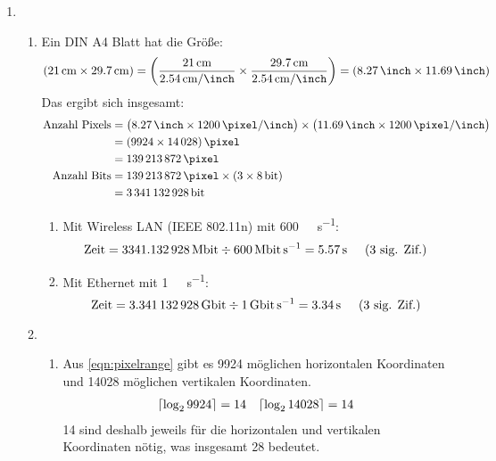 \begin{enumerate}[label={Aufgabe Ü\arabic*},start=1]
    \item 
    	\begin{enumerate}[label={\alph*.}]
    		\item Ein DIN A4 Blatt hat die Größe:
	    		\begin{equation}
	    			\left(\SI{21}{\centi\meter} \times \SI{29.7}{\centi\meter}\right) = 
	    			\left(\frac{\SI{21}{\centi\meter}}{\SI{2.54}{\centi\meter\per\inch}} \times \frac{\SI{29.7}{\centi\meter}}{\SI{2.54}{\centi\meter\per\inch}}\right) = \left(\SI{8,27}{\inch} \times \SI{11,69}{\inch}\right)
	    		\end{equation}
	    		Das ergibt sich insgesamt:
	    		\begin{align}
	    			\text{Anzahl Pixels} &= \left(\SI{8,27}{\inch} \times \SI{1200}{\pixel\per\inch}\right) \times \left(\SI{11,69}{\inch} \times \SI{1200}{\pixel\per\inch}\right) \notag \\
	    			&= \left(\num{9924} \times \num{14028}\right)\si{\pixel} \label{eqn:pixelrange} \\
	    			&= \SI{139213872}{\pixel} \\
	    			\text{Anzahl Bits} &= \SI{139213872}{\pixel} \times \left(3 \times \SI{8}{\bit}\right) \notag \\
	    			&= \SI{3341132928}{\bit}
	    		\end{align}

	    		\begin{enumerate}[label={(\roman*)}]
	    			\item Mit Wireless LAN (IEEE 802.11n) mit \SI[per-mode=symbol]{600}{\mega\bit\per\second}:
		    			\begin{equation}
		    				\text{Zeit} = \SI{3341.132928}{\mega\bit} \div \SI{600}{\mega\bit\per\second} = \SI{5,57}{\second} \sigfig{3}
		    			\end{equation}
	    			\item Mit Ethernet mit \SI[per-mode=symbol]{1}{\giga\bit\per\second}:
		    			\begin{equation}
		    				\text{Zeit} = \SI{3.341132928}{\giga\bit} \div \SI{1}{\giga\bit\per\second} = \SI{3,34}{\second} \sigfig{3}
		    			\end{equation}
	    		\end{enumerate}
	    	\item 
	    		\begin{enumerate}
	    			\item Aus \eqref{eqn:pixelrange} gibt es \num{9924} möglichen horizontalen Koordinaten und \num{14028} möglichen vertikalen Koordinaten.
		    			\begin{align*}
		    				\ceil*{\log_2 9924} = 14 && \ceil*{\log_2 14028} = 14
		    			\end{align*}
		    			\SI{14}{\bit} sind deshalb jeweils für die horizontalen und vertikalen Koordinaten nötig, was insgesamt \SI{28}{\bit} bedeutet.


\end{enumerate}
\end{enumerate}
\end{enumerate}
